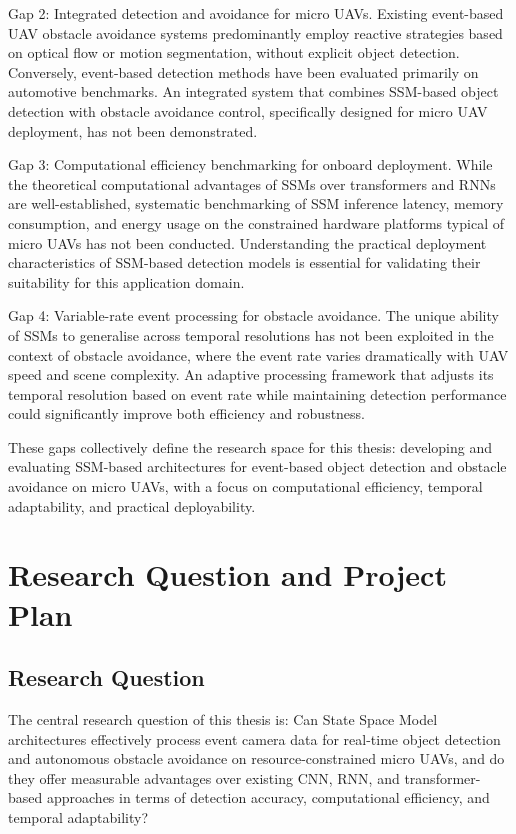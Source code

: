 \documentclass[11pt, a4paper]{report}
\begin{document}
Gap 2: Integrated detection and avoidance for micro UAVs. Existing event-based UAV obstacle avoidance systems \cite{falanga2019fast, sanket2020evdodgenet} predominantly employ reactive strategies based on optical flow or motion segmentation, without explicit object detection. Conversely, event-based detection methods \cite{perot2020learning,zhang2022spiking} have been evaluated primarily on automotive benchmarks. An integrated system that combines SSM-based object detection with obstacle avoidance control, specifically designed for micro UAV deployment, has not been demonstrated. 

Gap 3: Computational efficiency benchmarking for onboard deployment. While the theoretical computational advantages of SSMs over transformers and RNNs are well-established, systematic benchmarking of SSM inference latency, memory consumption, and energy usage on the constrained hardware platforms typical of micro UAVs has not been conducted. Understanding the practical deployment characteristics of SSM-based detection models is essential for validating their suitability for this application domain. 

Gap 4: Variable-rate event processing for obstacle avoidance. The unique ability of SSMs to generalise across temporal resolutions \cite{zubic2024state} has not been exploited in the context of obstacle avoidance, where the event rate varies dramatically with UAV speed and scene complexity. An adaptive processing framework that adjusts its temporal resolution based on event rate while maintaining detection performance could significantly improve both efficiency and robustness. 

These gaps collectively define the research space for this thesis: developing and evaluating SSM-based architectures for event-based object detection and obstacle avoidance on micro UAVs, with a focus on computational efficiency, temporal adaptability, and practical deployability. 


\chapter{Research Question and Project Plan} 

\section{Research Question}
The central research question of this thesis is: Can State Space Model architectures effectively process event camera data for real-time object detection and autonomous obstacle avoidance on resource-constrained micro UAVs, and do they offer measurable advantages over existing CNN, RNN, and transformer-based approaches in terms of detection accuracy, computational efficiency, and temporal adaptability? 
\end{document}
